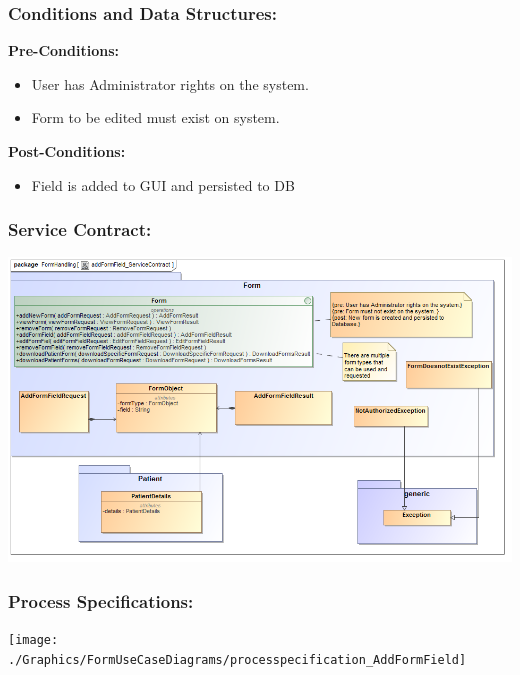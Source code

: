 \subsubsection{Conditions and Data Structures:}
\textbf{Pre-Conditions:}
\begin{itemize}
	\item User has Administrator rights on the system.
	\item Form to be edited must exist on system.
\end{itemize}

\textbf{Post-Conditions:}	
\begin{itemize}
	\item Field is added to GUI and persisted to DB
\end{itemize}
\subsubsection{Service Contract:} 
\includegraphics[width=1\linewidth]{./Graphics/FormUseCaseDiagrams/addFormField_ServiceContract}
\subsubsection{Process Specifications:} 
\texttt{[image: ./Graphics/FormUseCaseDiagrams/processpecification\_AddFormField]}






